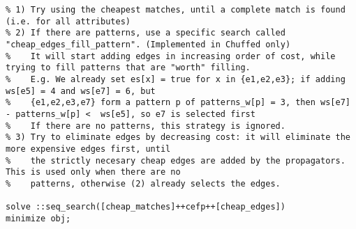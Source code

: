 \documentclass[letterpaper]{article} %
\newcommand{\minizinc}{\textsc{MiniZinc}}
\begin{document}
\begin{minipage}{\textwidth}
\begin{lstlisting}[caption={\minizinc{} model (part 2 of 2)},captionpos=b]
% The solver will use these strategies in order:
% 1) Try using the cheapest matches, until a complete match is found (i.e. for all attributes)
% 2) If there are patterns, use a specific search called "cheap_edges_fill_pattern". (Implemented in Chuffed only)
%    It will start adding edges in increasing order of cost, while trying to fill patterns that are "worth" filling.
%    E.g. We already set es[x] = true for x in {e1,e2,e3}; if adding ws[e5] = 4 and ws[e7] = 6, but
%    {e1,e2,e3,e7} form a pattern p of patterns_w[p] = 3, then ws[e7] - patterns_w[p] <  ws[e5], so e7 is selected first
%    If there are no patterns, this strategy is ignored.
% 3) Try to eliminate edges by decreasing cost: it will eliminate the more expensive edges first, until
%    the strictly necesary cheap edges are added by the propagators. This is used only when there are no 
%    patterns, otherwise (2) already selects the edges.

solve ::seq_search([cheap_matches]++cefp++[cheap_edges]) 
minimize obj;
	\end{lstlisting}
\end{minipage}
\end{document}
